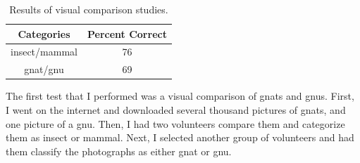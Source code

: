 \documentclass[12pt]{thesis}
\begin{document}
\begin{table}
\caption{Results of visual comparison studies.}
\begin{center}
  \begin{tabular}{|c|c|}
    \hline
    \bf Categories & \bf Percent Correct\\
    \hline
    \hline
    insect/mammal & 76\\
    \hline
    gnat/gnu & 69\\
    \hline
  \end{tabular}
\end{center}
\label{table:comp1}
\end{table}

The first test that I performed was a visual comparison of gnats and
gnus.  First, I went on the internet and downloaded several thousand
pictures of gnats, and one picture of a gnu.  Then, I had two
volunteers compare them and categorize them as insect
or mammal.
Next, I selected another group of volunteers and
had them classify the photographs as either gnat or gnu.
\end{document}
